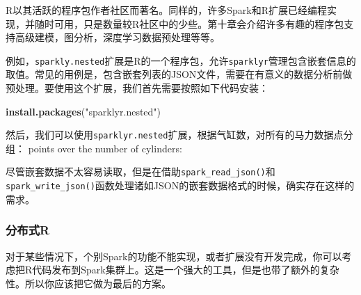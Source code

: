 \documentclass[
]{article}
\newenvironment{Shaded}{\begin{snugshade}}{\end{snugshade}}
\newcommand{\CommentTok}[1]{\textcolor[rgb]{0.56,0.35,0.01}{\textit{#1}}}
\newcommand{\DataTypeTok}[1]{\textcolor[rgb]{0.13,0.29,0.53}{#1}}
\newcommand{\DecValTok}[1]{\textcolor[rgb]{0.00,0.00,0.81}{#1}}
\newcommand{\ErrorTok}[1]{\textcolor[rgb]{0.64,0.00,0.00}{\textbf{#1}}}
\newcommand{\KeywordTok}[1]{\textcolor[rgb]{0.13,0.29,0.53}{\textbf{#1}}}
\newcommand{\NormalTok}[1]{#1}
\newcommand{\OperatorTok}[1]{\textcolor[rgb]{0.81,0.36,0.00}{\textbf{#1}}}
\newcommand{\StringTok}[1]{\textcolor[rgb]{0.31,0.60,0.02}{#1}}
\begin{document}
R以其活跃的程序包作者社区而著名。同样的，许多Spark和R扩展已经编程实现，并随时可用，只是数量较R社区中的少些。第十章会介绍许多有趣的程序包支持高级建模，图分析，深度学习数据预处理等等。

例如，\texttt{sparkly.nested}扩展是R的一个程序包，允许\texttt{sparklyr}管理包含嵌套信息的取值。常见的用例是，包含嵌套列表的JSON文件，需要在有意义的数据分析前做预处理。要使用这个扩展，我们首先需要按照如下代码安装：

\begin{Shaded}
\begin{Highlighting}[]
\KeywordTok{install.packages}\NormalTok{(}\StringTok{"sparklyr.nested"}\NormalTok{)}
\end{Highlighting}
\end{Shaded}

然后，我们可以使用\texttt{sparklyr.nested}扩展，根据气缸数，对所有的马力数据点分组：
points over the number of cylinders:

\begin{Shaded}
\end{Shaded}

尽管嵌套数据不太容易读取，但是在借助\texttt{spark\_read\_json()}和\texttt{spark\_write\_json()}函数处理诸如JSON的嵌套数据格式的时候，确实存在这样的需求。

\hypertarget{ux5206ux5e03ux5f0fr}{%
\subsubsection{分布式R}\label{ux5206ux5e03ux5f0fr}}

对于某些情况下，个别Spark的功能不能实现，或者扩展没有开发完成，你可以考虑把R代码发布到Spark集群上。这是一个强大的工具，但是也带了额外的复杂性。所以你应该把它做为最后的方案。
\end{document}
